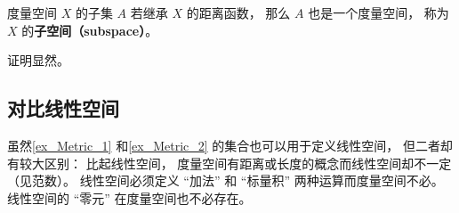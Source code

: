 \begin{corollary}{}
度量空间 $X$ 的子集 $A$ 若继承 $X$ 的距离函数， 那么 $A$ 也是一个度量空间， 称为 $X$ 的\textbf{子空间（subspace）}。
\end{corollary}
证明显然。

\subsection{对比线性空间}
虽然\autoref{ex_Metric_1} 和\autoref{ex_Metric_2} 的集合也可以用于定义线性空间， 但二者却有较大区别： 比起线性空间， 度量空间有距离或长度的概念而线性空间却不一定（见范数）。 线性空间必须定义 “加法” 和 “标量积” 两种运算而度量空间不必。 线性空间的 “零元” 在度量空间也不必存在。
